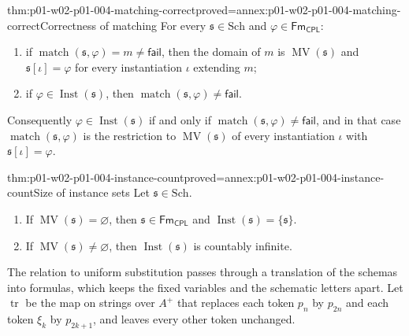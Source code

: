 \begin{hbtheorem}{thm:p01-w02-p01-004-matching-correct}{proved=annex:p01-w02-p01-004-matching-correct}{Correctness of matching}
For every \(\mathfrak s\in\mathrm{Sch}\) and
\(\varphi\in\mathsf{Fm}_{\mathsf{CPL}}\):
\begin{enumerate}
  \item if \(\operatorname{match}(\mathfrak s,\varphi)=m\ne\mathsf{fail}\),
        then the domain of \(m\) is \(\operatorname{MV}(\mathfrak s)\) and
        \(\mathfrak s[\iota]=\varphi\) for every instantiation \(\iota\)
        extending \(m\);
  \item if \(\varphi\in\operatorname{Inst}(\mathfrak s)\), then
        \(\operatorname{match}(\mathfrak s,\varphi)\ne\mathsf{fail}\).
\end{enumerate}
Consequently \(\varphi\in\operatorname{Inst}(\mathfrak s)\) if and only if
\(\operatorname{match}(\mathfrak s,\varphi)\ne\mathsf{fail}\), and in that
case \(\operatorname{match}(\mathfrak s,\varphi)\) is the restriction to
\(\operatorname{MV}(\mathfrak s)\) of every instantiation \(\iota\) with
\(\mathfrak s[\iota]=\varphi\).
\end{hbtheorem}

\begin{hbtheorem}{thm:p01-w02-p01-004-instance-count}{proved=annex:p01-w02-p01-004-instance-count}{Size of instance sets}
Let \(\mathfrak s\in\mathrm{Sch}\).
\begin{enumerate}
  \item If \(\operatorname{MV}(\mathfrak s)=\varnothing\), then
        \(\mathfrak s\in\mathsf{Fm}_{\mathsf{CPL}}\) and
        \(\operatorname{Inst}(\mathfrak s)=\{\mathfrak s\}\).
  \item If \(\operatorname{MV}(\mathfrak s)\ne\varnothing\), then
        \(\operatorname{Inst}(\mathfrak s)\) is countably infinite.
\end{enumerate}
\end{hbtheorem}

The relation to uniform substitution passes through a translation of the
schemas into formulas, which keeps the fixed variables and the schematic
letters apart.
Let \(\operatorname{tr}\) be the map on strings over \(A^{+}\) that replaces
each token \(p_n\) by \(p_{2n}\) and each token \(\xi_k\) by \(p_{2k+1}\), and
leaves every other token unchanged.

